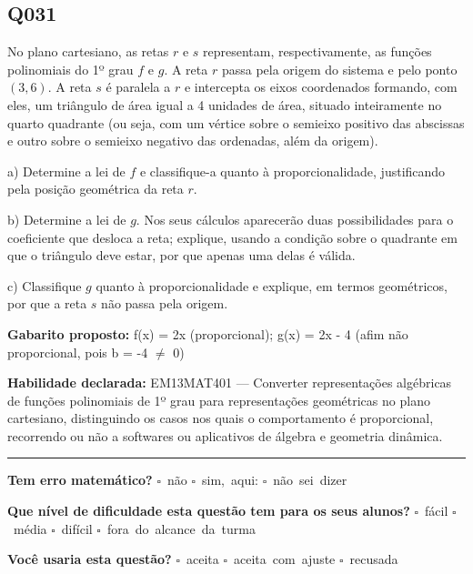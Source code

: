\documentclass[11pt,a4paper]{article}
\begin{document}
\begin{samepage}
\subsection*{Q031}
No plano cartesiano, as retas $r$ e $s$ representam, respectivamente, as funções polinomiais do 1º grau $f$ e $g$. A reta $r$ passa pela origem do sistema e pelo ponto $(3,6)$. A reta $s$ é paralela a $r$ e intercepta os eixos coordenados formando, com eles, um triângulo de área igual a 4 unidades de área, situado inteiramente no quarto quadrante (ou seja, com um vértice sobre o semieixo positivo das abscissas e outro sobre o semieixo negativo das ordenadas, além da origem).

a) Determine a lei de $f$ e classifique-a quanto à proporcionalidade, justificando pela posição geométrica da reta $r$.

b) Determine a lei de $g$. Nos seus cálculos aparecerão duas possibilidades para o coeficiente que desloca a reta; explique, usando a condição sobre o quadrante em que o triângulo deve estar, por que apenas uma delas é válida.

c) Classifique $g$ quanto à proporcionalidade e explique, em termos geométricos, por que a reta $s$ não passa pela origem.

\textbf{Gabarito proposto:} f(x) = 2x (proporcional); g(x) = 2x - 4 (afim não proporcional, pois b = -4 $\neq$ 0)

\textbf{Habilidade declarada:} EM13MAT401 --- Converter representações algébricas de funções polinomiais de 1º grau para representações geométricas no plano cartesiano, distinguindo os casos nos quais o comportamento é proporcional, recorrendo ou não a softwares ou aplicativos de álgebra e geometria dinâmica.
\end{samepage}

\noindent\rule{\linewidth}{0.4pt}
\textbf{Tem erro matemático?}\quad
\mbox{$\square$~não} \quad \mbox{$\square$~sim, aqui:} \underline{\hspace{5cm}}
\quad \mbox{$\square$~não sei dizer}

\textbf{Que nível de dificuldade esta questão tem para os seus alunos?}\quad
\mbox{$\square$~fácil} \quad \mbox{$\square$~média} \quad
\mbox{$\square$~difícil} \quad \mbox{$\square$~fora do alcance da turma}

\textbf{Você usaria esta questão?}\quad
\mbox{$\square$~aceita} \quad \mbox{$\square$~aceita com ajuste} \quad
\mbox{$\square$~recusada}
\end{document}
